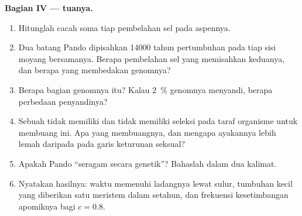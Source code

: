 \begin{problem}
\medskip
\noindent\textbf{Bagian IV ---  tuanya.}
\begin{enumerate}[resume]
  \item Hitunglah cacah  soma tiap pembelahan sel pada aspennya.
  \item Dua batang  Pando dipisahkan \num{14000} tahun pertumbuhan
        pada tiap sisi moyang bersamanya. Berapa pembelahan sel yang
        memisahkan keduanya, dan berapa  yang membedakan
        genomnya?
  \item Berapa bagian genomnya itu? Kalau \qty{2}{\%} genomnya
        menyandi, berapa perbedaan penyandinya?
  \item Sebuah  tidak memiliki  dan tidak memiliki seleksi
        pada taraf organisme untuk membuang  ini. Apa yang
        membuangnya, dan mengapa ayakannya lebih lemah daripada pada
        garis keturunan seksual?
  \item Apakah Pando ``seragam secara genetik''? Bahaslah dalam dua
        kalimat.
  \item Nyatakan hasilnya: waktu memenuhi ladangnya lewat sulur,
        tumbuhan kecil yang diberikan satu meristem dalam setahun, dan
        frekuensi kesetimbangan apomiknya bagi $c = 0.8$.
\end{enumerate}
\end{problem}
